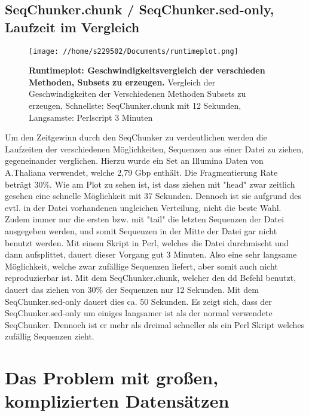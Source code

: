 \documentclass{scrartcl}
\begin{document}
\subsection{SeqChunker.chunk / SeqChunker.sed-only, Laufzeit im Vergleich}
\label{sec-5-4}
\begin{figure}
\texttt{[image: //home/s229502/Documents/runtimeplot.png]}
\caption[Runtimeplot: Geschwindigkeitsvergleich der verschieden Methoden, Subsets zu erzeugen.]{\textbf{Runtimeplot: Geschwindigkeitsvergleich der verschieden Methoden, Subsets zu erzeugen.} Vergleich der Geschwindigkeiten der Verschiedenen Methoden Subsets zu erzeugen, Schnellste: SeqChunker.chunk mit 12 Sekunden, Langsamste: Perlscript 3 Minuten}
\end{figure}

Um den Zeitgewinn durch den SeqChunker zu verdeutlichen werden die Laufzeiten der verschiedenen Möglichkeiten, Sequenzen aus einer Datei zu ziehen, gegeneinander
verglichen. Hierzu wurde ein Set an Illumina Daten von A.Thaliana verwendet, welche 2,79 Gbp enthält. Die Fragmentierung Rate beträgt 30\%.
Wie am Plot zu sehen ist, ist dass ziehen mit "head" zwar zeitlich gesehen eine schnelle Möglichkeit mit 37 Sekunden. Dennoch ist sie aufgrund des evtl. in 
der Datei vorhandenen ungleichen Verteilung, nicht die beste Wahl. Zudem immer nur die ersten bzw. mit "tail" die letzten Sequenzen der Datei ausgegeben werden, und 
somit Sequenzen in der Mitte der Datei gar nicht benutzt werden. Mit einem Skript in Perl, welches die Datei durchmischt und dann aufsplittet, dauert dieser Vorgang 
gut 3 Minuten. Also eine sehr langsame Möglichkeit, welche zwar zufällige Sequenzen liefert, aber somit auch nicht reproduzierbar ist. Mit dem SeqChunker.chunk, welcher den 
dd Befehl benutzt, dauert das ziehen von 30\% der Sequenzen nur 12 Sekunden. Mit dem SeqChunker.sed-only dauert dies ca. 50 Sekunden. Es zeigt sich, dass der SeqChunker.sed-only
um einiges langsamer ist als der normal verwendete SeqChunker. Dennoch ist er mehr als dreimal schneller als ein Perl Skript welches zufällig Sequenzen zieht.




\clearpage
\section{Das Problem mit großen, komplizierten Datensätzen}
\label{sec-6}
\end{document}
